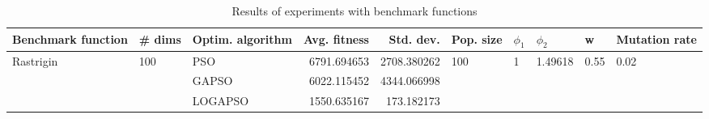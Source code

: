 \begin{table}
\centering
\caption{Results of experiments with benchmark functions}
\begin{tabular}{lllrrlllll}
\toprule
        Benchmark function &              \# dims & Optim. algorithm &  Avg. fitness &   Std. dev. &            Pop. size &         $\phi_{1}$ &               $\phi_{2}$ &                     w &         Mutation rate \\
\midrule
\multirow{3}{*}{Rastrigin} & \multirow{3}{*}{100} &              PSO &   6791.694653 & 2708.380262 & \multirow{3}{*}{100} & \multirow{3}{*}{1} & \multirow{3}{*}{1.49618} & \multirow{3}{*}{0.55} & \multirow{3}{*}{0.02} \\
                           &                      &            GAPSO &   6022.115452 & 4344.066998 &                      &                    &                          &                       &                       \\
                           &                      &          LOGAPSO &   1550.635167 &  173.182173 &                      &                    &                          &                       &                       \\
\bottomrule
\end{tabular}
\end{table}
